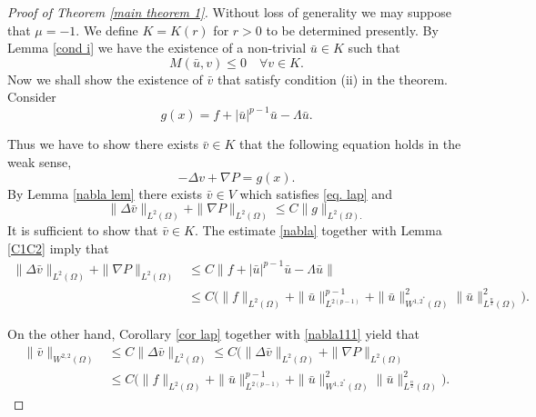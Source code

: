 \documentclass[reqno]{amsart}
\begin{document}
\begin{proof}[Proof of Theorem \ref{main theorem 1}]
 Without loss of generality we may suppose that \(\mu=-1\).
We define \(K = K({r})\) for $r>0$ to be determined presently.
By Lemma \ref{cond i} we have the existence of a non-trivial \(\bar{u} \in K\)
such that
\[
M(\bar{u}, v)\leq 0\quad  \forall v\in  K.
\]
Now we shall show the existence of \(\bar{v}\) that satisfy condition (ii) in the
theorem. Consider
\[
g(x)=f+|\bar{u}|^{p-1}\bar{u}-\Lambda \bar{u}.
\]

Thus we have to show there exists \(\bar{v}\in K\)  that the following equation holds
in the weak sense,
\begin{equation}\label{eq. lap}
   -\Delta v + \nabla P=g(x).
\end{equation}
By Lemma \ref{nabla lem} there exists \(\bar{v}\in V \)
which satisfies \eqref{eq. lap} and
\begin{equation}\label{nabla}
\rVert \Delta \bar{v} \rVert_{L^2(\Omega)}
+\rVert \nabla P \rVert_{L^2(\Omega)}\leq C\rVert g \rVert_{L^2(\Omega).}
\end{equation}
It is sufficient to show that \( \bar{v}\in K\). The  estimate \eqref{nabla}
together with  Lemma \ref{C1C2} imply that
\begin{equation} \label{nabla111}
\begin{aligned}
   \rVert \Delta {\bar{v}} \rVert_{L^2(\Omega)}
   +\rVert \nabla P \rVert_{L^2(\Omega)}
   &\leq C \rVert f+|\bar{u}|^{p-1}\bar{u}-\Lambda \bar{u}\rVert \\
   &\leq C\big( \rVert f\rVert_{L^2(\Omega)}+\rVert \bar{u}\rVert^{p-1}_{L^{2(p-1)}}
   +\rVert \bar{u}\rVert^{2}_{W^{1,2^*}(\Omega)} \rVert
    \bar{u}\rVert^2_{L^{\frac{n}{2}}(\Omega)} \big) .
\end{aligned}
\end{equation}

On the other hand, Corollary \ref{cor lap} together with \eqref{nabla111} yield that
\begin{equation}\label{CC}
\begin{aligned}
    \rVert \bar{v} \rVert_{ W^{2,2}(\Omega)}
     &\leq C \rVert \Delta \bar{v} \rVert_{ L^2(\Omega)}
     \leq {C}\big(\rVert \Delta \bar{v} \rVert_{L^2(\Omega)}
    +\rVert \nabla P \rVert_{L^2(\Omega)} \\
     &\leq C\big( \rVert f\rVert_{L^2(\Omega)}
    +\rVert \bar{u}\rVert^{p-1}_{L^{2(p-1)}}
    +\rVert \bar{u}\rVert^{2}_{W^{1,2^*}(\Omega)} \rVert
    \bar{u}\rVert^2_{L^{\frac{n}{2}}(\Omega)} \big).
\end{aligned}
\end{equation}



\end{proof}
\end{document}
